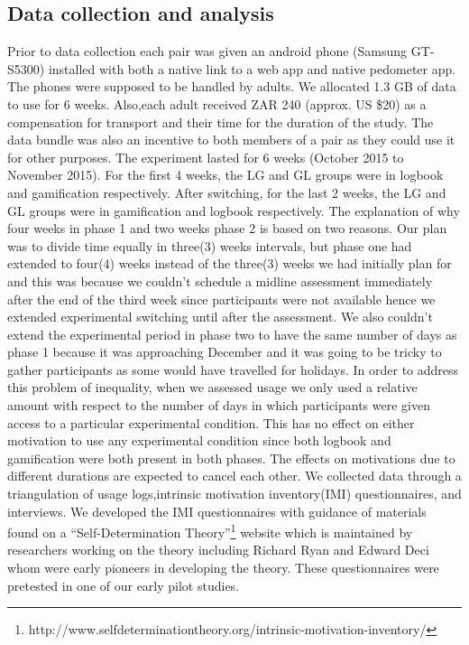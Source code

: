 \documentclass{sig-alternate}
\begin{document}
\subsection{Data collection and analysis} 
Prior to data collection each pair was given an android phone (Samsung
GT-S5300) installed with both a native link to a web app and native pedometer app. The phones were supposed to be handled by adults. We allocated 1.3 GB of data to use for 6 weeks. Also,each adult received ZAR 240 (approx. US \$20) as a compensation for transport and their time for the duration of the study. The data bundle was also an incentive to both members of a pair as they could use it for other purposes. \newline
The experiment lasted for 6 weeks (October 2015 to November 2015). For the first 4 weeks, the LG and GL groups were in logbook and gamification respectively. After switching, for the last 2 weeks, the LG and GL groups were in gamification and logbook respectively. The explanation of why four weeks in phase 1 and two weeks phase 2 is based on two reasons. Our plan was to divide time equally in three(3) weeks intervals, but phase one had extended to four(4) weeks instead of the three(3) weeks we had initially plan for and this was because we couldn't schedule a midline assessment immediately after the end of the third week since participants were not available hence we extended experimental switching until after the assessment. We also couldn't extend the experimental period in phase two to have the same number of days as phase 1 because it was approaching December and it was going to be tricky to gather participants as some would have travelled for holidays. In order to address this problem of inequality, when we assessed usage we only used a relative amount with respect to the number of days in which participants were given access to a particular experimental condition. This has no effect on either motivation to use any experimental condition since both logbook and gamification were both present in both phases. The effects on motivations due to different durations are expected to cancel each other.\newline
We collected data through a triangulation of usage logs,intrinsic motivation inventory(IMI) questionnaires, and interviews. We developed the IMI questionnaires with guidance of materials found on a ``Self-Determination Theory''\footnote{http://www.selfdeterminationtheory.org/intrinsic-motivation-inventory/} website which is maintained by researchers working on the theory including Richard Ryan and Edward Deci\cite{deci1985intrinsic} whom were early pioneers in developing the theory. These questionnaires were pretested in one of our early pilot studies.\newline
\end{document}
